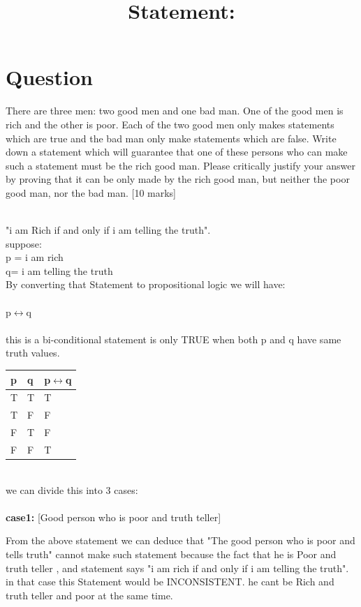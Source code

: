 \documentclass[12pt,a4paper]{article}
\begin{document}
		
	\section{Question}	
	There are three men: two good men and one bad man. One of the good men is rich and the other is poor. Each of the two good men only makes statements which are true and the bad man only make statements which are false. Write down a statement which will guarantee that one of these persons who can make such a statement must be the rich good man. Please critically justify your answer by proving that it can be only made by the rich good man, but neither the poor good man, nor the bad man.
	[10 marks]\\
	
	\title{Statement:}\\
	"i am Rich if and only if i am telling the truth".\\
	
	suppose: \\
	p = i am rich\\
	q= i am telling the truth\\
	By converting that Statement to propositional logic we will have:\\
	\\
	p$\leftrightarrow$q\\
	\\
	this is a bi-conditional statement is only TRUE when both p and q have same truth values. 
	
		\begin{tabular} {|l|l||l|}
		\hline
		\hline
		p&q&	p$\leftrightarrow$q \\
		\hline
		\hline
		T&T&T \\
		T&F&F \\
		F&T&F \\
		F&F&T \\
	
		
	\end{tabular}\\

we can divide this into 3 cases:\\
\\
\textbf{case1:} [Good person who is poor and truth teller]

From the above statement we can deduce that "The good person who is poor and tells truth" cannot make such statement because the fact that he is Poor and truth teller , and statement says "i am rich if and only if i am telling the truth". in that case this Statement would be INCONSISTENT. he cant be Rich and truth teller and poor at the same time.
\\
\\
\\
\\
\\
\\
\end{document}
